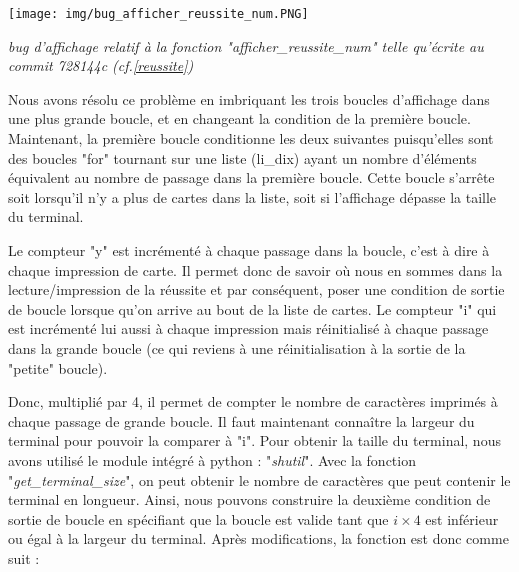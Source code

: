 \documentclass[10pt,a4paper,french,titlepage]{article}
\theoremstyle{definition}
\begin{document}
\begin{center}
\texttt{[image: img/bug\_afficher\_reussite\_num.PNG]}
\end{center}
\begin{center}
\textit{bug d'affichage relatif à la fonction "afficher\_reussite\_num" telle qu'écrite au commit 728144c (cf.\ref{reussite})}
\end{center}

Nous avons résolu ce problème en imbriquant les trois boucles d'affichage dans une plus grande boucle, et en changeant la condition de la première boucle. Maintenant, la première boucle conditionne les deux suivantes puisqu'elles sont des boucles "for" tournant sur une liste (li\_dix) ayant un nombre d'éléments équivalent au nombre de passage dans la première boucle. Cette boucle s'arrête soit lorsqu'il n'y a plus de cartes dans la liste, soit si l'affichage dépasse la taille du terminal. 

Le compteur "y" est incrémenté à chaque passage dans la boucle, c'est à dire à chaque impression de carte. Il permet donc de savoir où nous en sommes dans la lecture/impression de la réussite et par conséquent, poser une condition de sortie de boucle lorsque qu'on arrive au bout de la liste de cartes. Le compteur "i" qui est incrémenté lui aussi à chaque impression mais réinitialisé à chaque passage dans la grande boucle (ce qui reviens à une réinitialisation à la sortie de la "petite" boucle). 

Donc, multiplié par 4, il permet de compter le nombre de caractères imprimés à chaque passage de grande boucle. Il faut maintenant connaître la largeur du terminal pour pouvoir la comparer à "i". Pour obtenir la taille du terminal, nous avons utilisé le module intégré à python : "\textit{shutil}". Avec la fonction "\textit{get\_terminal\_size}", on peut obtenir le nombre de caractères que peut contenir le terminal en longueur. Ainsi, nous pouvons construire la deuxième condition de sortie de boucle en spécifiant que la boucle est valide tant que $i \times 4$ est inférieur ou égal à la largeur du terminal. Après modifications, la fonction est donc comme suit :
\end{document}
